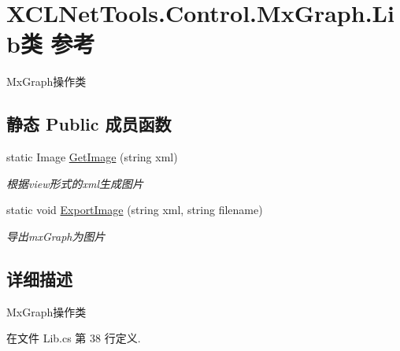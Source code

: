 \hypertarget{class_x_c_l_net_tools_1_1_control_1_1_mx_graph_1_1_lib}{\section{X\-C\-L\-Net\-Tools.\-Control.\-Mx\-Graph.\-Lib类 参考}
\label{class_x_c_l_net_tools_1_1_control_1_1_mx_graph_1_1_lib}
}


Mx\-Graph操作类  


\subsection*{静态 Public 成员函数}
\begin{DoxyCompactItemize}
\item 
static Image \hyperlink{class_x_c_l_net_tools_1_1_control_1_1_mx_graph_1_1_lib_abff455d51f61485d6bf26e0133af6000}{Get\-Image} (string xml)
\begin{DoxyCompactList}\small\item\em 根据view形式的xml生成图片 \end{DoxyCompactList}\item 
static void \hyperlink{class_x_c_l_net_tools_1_1_control_1_1_mx_graph_1_1_lib_ad6b09c60b11a1f51a6bf45cc3bde1b88}{Export\-Image} (string xml, string filename)
\begin{DoxyCompactList}\small\item\em 导出mx\-Graph为图片 \end{DoxyCompactList}\end{DoxyCompactItemize}


\subsection{详细描述}
Mx\-Graph操作类 



在文件 Lib.\-cs 第 38 行定义.



